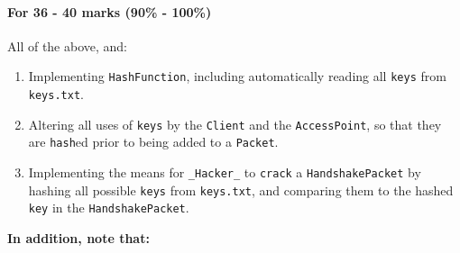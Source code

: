 \documentclass[11pt]{article}
\begin{document}
\paragraph{For 36 - 40 marks (90\% - 100\%)}
			
			All of the above, and:  \begin{enumerate}
			
				\item Implementing \texttt{HashFunction}, including automatically reading all \texttt{keys} from \texttt{keys.txt}.
				
				\item Altering all uses of \texttt{keys} by the \texttt{Client} and the \texttt{AccessPoint}, so that they are \texttt{hash}ed prior to being added to a \texttt{Packet}.
				
				\item Implementing the means for \texttt{_Hacker_} to \texttt{crack} a \texttt{HandshakePacket} by hashing all possible \texttt{keys} from \texttt{keys.txt}, and comparing them to the hashed \texttt{key} in the \texttt{HandshakePacket}.
				
			\end{enumerate}
		
\textbf{In addition, note that:}
\end{document}
